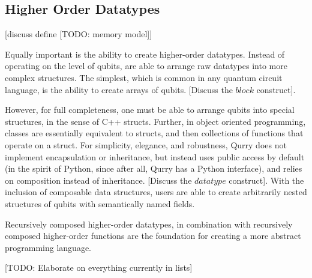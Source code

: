 \documentclass[journal]{article}
\begin{document}
    \subsection{Higher Order Datatypes}

    [discuss define [TODO: memory model]]

    Equally important is the ability to create higher-order datatypes.
    Instead of operating on the level of qubits, are able to arrange raw datatypes into more complex structures.
    The simplest, which is common in any quantum circuit language, is the ability to create arrays of qubits.
    [Discuss the $block$ construct].

    However, for full completeness, one must be able to arrange qubits into special structures, in the sense of C++ structs.
    Further, in object oriented programming, classes are essentially equivalent to structs, and then collections of functions that operate on a struct.
    For simplicity, elegance, and robustness, Qurry does not implement encapsulation or inheritance, but instead uses public access by default (in the spirit of Python, since after all, Qurry has a Python interface), and relies on composition instead of inheritance.
    [Discuss the $datatype$ construct].
    With the inclusion of composable data structures, users are able to create arbitrarily nested structures of qubits with semantically named fields.

    Recursively composed higher-order datatypes, in combination with recursively composed higher-order functions are the foundation for creating a more abstract programming language.

    [TODO: Elaborate on everything currently in lists]
\end{document}
